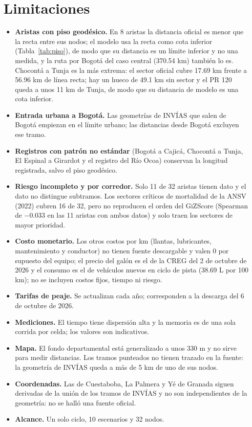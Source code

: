 \documentclass[12pt,a4paper]{article}
\begin{document}
\section{Limitaciones}

\begin{itemize}
\item \textbf{Aristas con piso geodésico.} En 8 aristas la distancia oficial es menor
que la recta entre sus nodos; el modelo usa la recta como cota inferior
(Tabla~\ref{tab:piso}), de modo que su distancia es un límite inferior y no una
medida, y la ruta por Bogotá del caso central (370.54 km) también lo es. Chocontá
a Tunja es la más extrema: el sector oficial cubre 17.69 km frente a 56.96 km de
línea recta; hay un hueco de 49.1 km sin sector y el PR 120 queda a unos 11 km
de Tunja, de modo que su distancia de modelo es una cota inferior.
\item \textbf{Entrada urbana a Bogotá.} Las geometrías de INVÍAS que salen de
Bogotá empiezan en el límite urbano; las distancias desde Bogotá excluyen ese
tramo.
\item \textbf{Registros con patrón no estándar} (Bogotá a Cajicá, Chocontá a
Tunja, El Espinal a Girardot y el registro del Río Ocoa) conservan la longitud
registrada, salvo el piso geodésico.
\item \textbf{Riesgo incompleto y por corredor.} Solo 11 de 32 aristas tienen
dato y el dato no distingue subtramos. Los sectores críticos de mortalidad de la
ANSV (2022) cubren 16 de 32, pero no reproducen el orden del GiZScore
(Spearman de $-0.033$ en las 11 aristas con ambos datos) y solo traen los
sectores de mayor prioridad.
\item \textbf{Costo monetario.} Los otros costos por km (llantas, lubricantes,
mantenimiento y conductor) no tienen fuente descargable y valen 0 por supuesto
del equipo; el precio del galón es el de la CREG del 2 de octubre de 2026 y el
consumo es el de vehículos nuevos en ciclo de pista (38.69 L por 100 km); no se
incluyen costos fijos, tiempo ni riesgo.
\item \textbf{Tarifas de peaje.} Se actualizan cada año; corresponden a la
descarga del 6 de octubre de 2026.
\item \textbf{Mediciones.} El tiempo tiene dispersión alta y la memoria es de
una sola corrida por celda; los valores son indicativos.
\item \textbf{Mapa.} El fondo departamental está generalizado a unos 330 m
y no sirve para medir distancias. Los tramos punteados no tienen trazado en la
fuente: la geometría de INVÍAS queda a más de 5 km de uno de sus nodos.
\item \textbf{Coordenadas.} Las de Cuestaboba, La Palmera y Yé de Granada
siguen derivadas de la unión de los tramos de INVÍAS y no son independientes de
la geometría: no se halló una fuente oficial.
\item \textbf{Alcance.} Un solo ciclo, 10 escenarios y 32 nodos.
\end{itemize}
\end{document}
